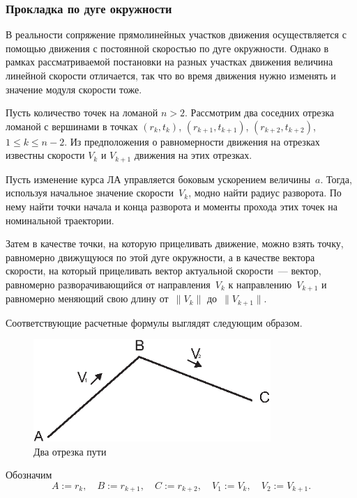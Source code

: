 \documentclass[a4paper,12pt]{article}
\numberwithin{figure}{subsubsection}
\begin{document}
\subsubsection{Прокладка по дуге окружности}

В реальности сопряжение прямолинейных участков движения осуществляется с помощью движения с постоянной скоростью по дуге окружности. Однако в рамках рассматриваемой постановки на разных участках движения величина линейной скорости отличается, так что во время движения нужно изменять и значение модуля скорости тоже.

Пусть количество точек на ломаной $n>2$. Рассмотрим два соседних отрезка ломаной с вершинами в точках $(r_k,t_k)$, $(r_{k+1},t_{k+1})$, $(r_{k+2},t_{k+2})$, $1 \leqslant k \leqslant n-2$. Из предположения о равномерности движения на отрезках известны скорости $V_k$ и $V_{k+1}$ движения на этих отрезках.

Пусть изменение курса ЛА управляется боковым ускорением величины~$a$. Тогда, используя начальное значение скорости~$V_k$, модно найти радиус разворота. По нему найти точки начала и конца разворота и моменты прохода этих точек на номинальной траектории.

Затем в качестве точки, на которую прицеливать движение, можно взять точку, равномерно движущуюся по этой дуге окружности, а в качестве вектора скорости, на который прицеливать вектор актуальной скорости~--- вектор, равномерно разворачивающийся от направления~$V_k$ к направлению~$V_{k+1}$ и равномерно меняющий свою длину от~$\|V_k\|$ до~$\|V_{k+1}\|$.

Соответствующие расчетные формулы выглядят следующим образом.

\begin{figure}[h]
  \centering
  \includegraphics[width=90mm]{3point.eps}
  \caption{Два отрезка пути}\label{two_lines}
\end{figure}
  
Обозначим
\begin{equation*}
    A:=r_k, \quad B:=r_{k+1}, \quad C:=r_{k+2}, \quad
      V_1 := V_k, \quad V_2:= V_{k+1}.
\end{equation*}
\end{document}

